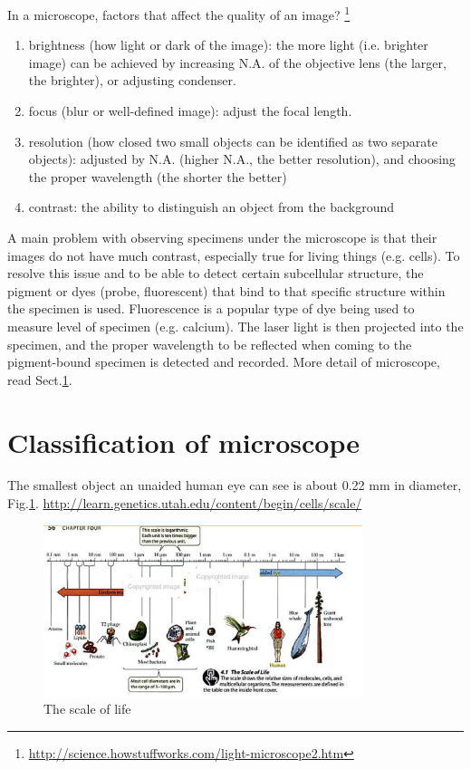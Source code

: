 In a microscope, factors that affect the quality of an image?
\footnote{\url{http://science.howstuffworks.com/light-microscope2.htm}}
\begin{enumerate}
  \item brightness (how light or dark of the image): the more light (i.e.
  brighter image) can be achieved by increasing N.A. of the objective lens (the
  larger, the brighter), or adjusting condenser.
  
  \item focus (blur or well-defined image): adjust the focal length.
  
  \item resolution (how closed two small objects can be identified as two
  separate objects): adjusted by N.A. (higher N.A., the better resolution), and
  choosing the proper wavelength (the shorter the better) 
  
  \item contrast: the ability to distinguish an object from the background
\end{enumerate}

A main problem with observing specimens under the microscope is that their
images do not have much contrast, especially true for living things (e.g.
cells). To resolve this issue and to be able to detect certain subcellular
structure, the pigment or dyes (probe, fluorescent) that bind to that specific
structure within the specimen is used. Fluorescence is a popular type of dye
being used to measure level of specimen (e.g. calcium).  The laser light is then
projected into the specimen, and the proper wavelength to be reflected when
coming to the pigment-bound specimen is detected and recorded. More detail of
microscope, read Sect.\ref{sec:microscope}.


\section{Classification of microscope}
\label{sec:microscope}

The smallest object an unaided human eye can see is about 0.22 mm in diameter,
Fig.\ref{fig:scale_life}.
\url{http://learn.genetics.utah.edu/content/begin/cells/scale/}

\begin{figure}[hbt]
  \centerline{\includegraphics[height=5cm, angle=0]{./images/scale_life.eps}}
  \caption{The scale of life\citep{purves2001}}
  \label{fig:scale_life}
\end{figure}

